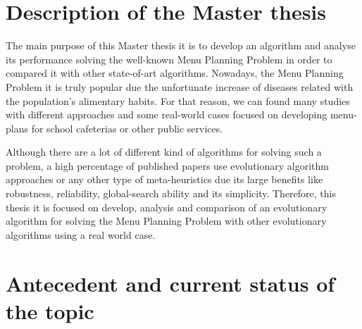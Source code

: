 \section{Description of the Master thesis}

The main purpose of this Master thesis it is to develop an algorithm and analyse its performance solving the well-known Menu Planning Problem in order to compared it with other state-of-art algorithms. Nowadays, the Menu Planning Problem it is truly popular due the unfortunate increase of diseases related with the population's alimentary habits. For that reason, we can found many studies with different approaches and some real-world cases focused on developing menu-plans for school cafeterias or other public services.

Although there are a lot of different kind of algorithms for solving such a problem, a high percentage of published papers use evolutionary algorithm approaches or any other type of meta-heuristics due its large benefits like robustness, reliability, global-search ability and its simplicity. Therefore, this thesis it is focused on develop, analysis and comparison of an evolutionary algorithm for solving the Menu Planning Problem with other evolutionary algorithms 
using a real world case.

\section{Antecedent and current status of the topic}